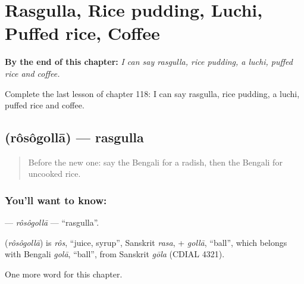 
\chapter{Rasgulla, Rice pudding, Luchi, Puffed rice, Coffee}
\label{ch:bn-rasgulla-rice-pudding-luchi-puffed-rice-coffee}

\begin{chapteropening}
\textbf{By the end of this chapter:} \emph{I can say rasgulla, rice pudding, a luchi, puffed rice and coffee.}

Complete the last lesson of chapter 118: I can say rasgulla, rice pudding, a luchi, puffed rice and coffee.
\end{chapteropening}

\section[\texorpdfstring{\bn{রসগোল্লা} (rôsôgollā)}{রসগোল্লা (rôsôgollā)}]{ (rôsôgollā) — rasgulla}

\label{lesson:BN-C118-rosogolla}



\begin{quote}
Before the new one: say the Bengali for a radish, then the Bengali for uncooked rice.
\end{quote}

\subsection*{You'll want to know: }
\textbf{} — \emph{rôsôgollā} — \textquotedblleft{}rasgulla\textquotedblright{}.

\begin{cousinweb}
\textbf{} (\emph{rôsôgollā}) is \emph{rôs}, \textquotedblleft{}juice, syrup\textquotedblright{}, Sanskrit \emph{rasa}, + \emph{gollā}, \textquotedblleft{}ball\textquotedblright{}, which belongs with Bengali \emph{golā}, \textquotedblleft{}ball\textquotedblright{}, from Sanskrit \emph{gōla} (CDIAL 4321).
\end{cousinweb}

\begin{grammarlens}[title={What you've built}]
One more word for this chapter.
\end{grammarlens}

